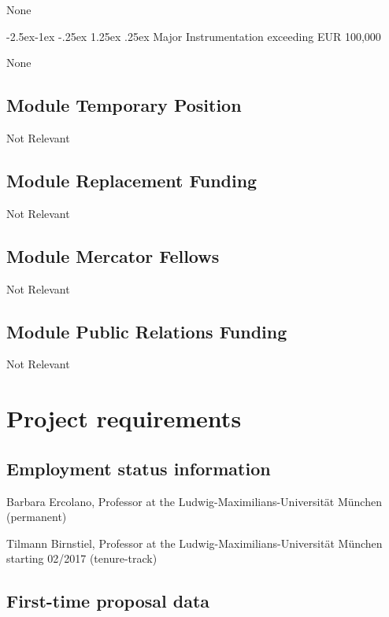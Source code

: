 \documentclass[10pt,fleqn,twoside]{article}
\makeatletter
\newcommand{\Tcol}{\color{blue}}
\renewcommand\paragraph{\@startsection{paragraph}{4}{\z@}%
            {-2.5ex\@plus -1ex \@minus -.25ex}%
            {1.25ex \@plus .25ex}%
            {\normalfont\normalsize\bfseries}}
\makeatother
\begin{document}
None

\paragraph{\Tcol Major Instrumentation exceeding EUR 100,000} 

None 

\subsection{\Tcol Module Temporary Position}

Not Relevant 

\subsection{\Tcol Module Replacement Funding}

Not Relevant 

\subsection{\Tcol Module Mercator Fellows}

Not Relevant 

\subsection{\Tcol Module Public Relations Funding}

Not Relevant 

\section{\Tcol Project requirements}
\renewcommand{\leftmark}{\sc Project requirements}

\subsection{\Tcol Employment status information}

Barbara Ercolano, Professor at the Ludwig-Maximilians-Universit\"at
M\"unchen  (permanent)

Tilmann Birnstiel, Professor at the Ludwig-Maximilians-Universit\"at M\"unchen starting 02/2017  (tenure-track)

\subsection{\Tcol First-time proposal data}
\end{document}
